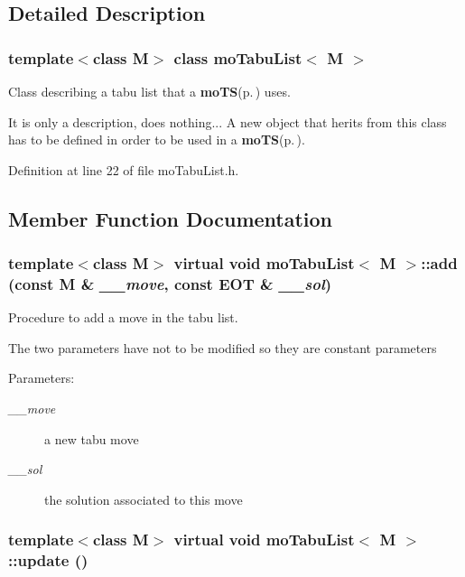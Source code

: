 \subsection{Detailed Description}
\subsubsection*{template$<$class M$>$ class mo\-Tabu\-List$<$ M $>$}

Class describing a tabu list that a {\bf mo\-TS}{\rm (p.\,\pageref{classmo_t_s})} uses. 

It is only a description, does nothing... A new object that herits from this class has to be defined in order to be used in a {\bf mo\-TS}{\rm (p.\,\pageref{classmo_t_s})}. 



Definition at line 22 of file mo\-Tabu\-List.h.

\subsection{Member Function Documentation}
\subsubsection{\setlength{\rightskip}{0pt plus 5cm}template$<$class M$>$ virtual void {\bf mo\-Tabu\-List}$<$ M $>$::add (const M \& {\em \_\-\_\-move}, const {\bf EOT} \& {\em \_\-\_\-sol})\hspace{0.3cm}{\tt  [pure virtual]}}\label{classmo_tabu_list_d279d72cb486d812da1ad3d24a69c286}


Procedure to add a move in the tabu list. 

The two parameters have not to be modified so they are constant parameters

\begin{Desc}
\item[Parameters:]
\begin{description}
\item[{\em \_\-\_\-move}]a new tabu move \item[{\em \_\-\_\-sol}]the solution associated to this move \end{description}
\end{Desc}
\subsubsection{\setlength{\rightskip}{0pt plus 5cm}template$<$class M$>$ virtual void {\bf mo\-Tabu\-List}$<$ M $>$::update ()\hspace{0.3cm}{\tt  [pure virtual]}}\label{classmo_tabu_list_a2e5d1132f064093c8ed57046405f5ca}


